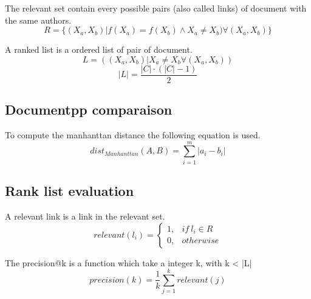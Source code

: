 \begin{definition}
  The relevant set contain every possible pairs (also called links) of document with the same authors.
  \begin{equation}
    R = \{(X_a, X_b) | f(X_a) = f(X_b) \land X_a \neq X_b) \forall (X_a, X_b)\}
  \end{equation}
\end{definition}

\begin{definition}
  A ranked list is a ordered list of pair of document.
  \begin{equation}
    L = ((X_a, X_b) | X_a \neq X_b \forall (X_a, X_b))
  \end{equation}
  \begin{equation}
    |L| = \frac{|C| \cdot (|C| - 1)}{2}
  \end{equation}
\end{definition}

\subsection{Documentpp comparaison}

\begin{definition}
  To compute the manhanttan distance the following equation is used.
  \begin{equation}
    dist_{Manhanttan}(A, B) = \sum_{i=1}^{m} |a_i - b_i|
  \end{equation}
\end{definition}

\subsection{Rank list evaluation}

\begin{definition}
  A relevant link is a link in the relevant set.
  \begin{equation}
    relevant(l_i) =
    \begin{cases}
      1, & if\ l_i \in R \\
      0, & otherwise
    \end{cases}
  \end{equation}
\end{definition}

\begin{definition}[Precision@k]
  The precision@k is a function which take a integer k, with k < |L|
  \begin{equation}
    precision(k) = \frac{1}{k} \sum_{j=1}^{k} relevant(j)
  \end{equation}
\end{definition}

